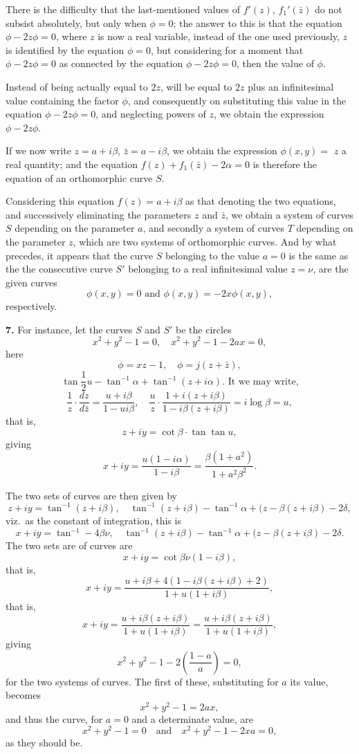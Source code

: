 \documentclass[11pt,a4paper]{book}
\begin{document}
There is the difficulty that the last-mentioned values of $f'(z)$, $f_1'(\bar{z})$ do not subsist absolutely, but only when $\phi = 0$; the answer to this is that the equation $\phi - 2 z \phi = 0$, where $z$ is now a real variable, instead of the one used previously, $z$ is identified by the equation $\phi = 0$, but considering for a moment that $\phi - 2 z \phi = 0$ as connected by the equation $\phi - 2 z \phi = 0$, then the value of $\phi$.

Instead of being actually equal to $2z$, will be equal to $2z$ plus an infinitesimal value containing the factor $\phi$, and consequently on substituting this value in the equation $\phi - 2 z \phi = 0$, and neglecting powers of $z$, we obtain the expression $\phi - 2 z \phi$.

If we now write $z = a + i \beta$, $\bar{z} = a - i \beta$, we obtain the expression $\phi(x, y) = $ $z$ a real quantity; and the equation $f(z) + f_1(\bar{z}) - 2 \alpha = 0$ is therefore the equation of an orthomorphic curve $S$.

Considering this equation $f(z) = a + i \beta$ as that denoting the two equations, and successively eliminating the parameters $z$ and $\bar{z}$, we obtain a system of curves $S$ depending on the parameter $a$, and secondly a system of curves $T$ depending on the parameter $z$, which are two systems of orthomorphic curves. And by what precedes, it appears that the curve $S$ belonging to the value $a = 0$ is the same as the
the consecutive curve $S'$ belonging to a real infinitesimal value $z = \nu$, are the given curves
\[
\phi(x, y) = 0 \text{ and } \phi(x, y) = - 2x\phi(x, y),
\]
respectively.

\textbf{7.} For instance, let the curves $S$ and $S'$ be the circles
\[
x^2 + y^2 - 1 = 0, \quad x^2 + y^2 - 1 - 2a x = 0,
\]
here
\[
\phi = x z - 1, \quad \phi = j (z + \bar{z}),
\]
\[
\tan \frac{1}{2}u - \tan^{-1} \alpha + \tan^{-1}(z + i \alpha). \text{ It we may write,}
\]
\[
\frac{1}{z} \cdot \frac{dz}{d\bar{z}} = \frac{u + i \beta}{1 - u i \beta}, \quad \frac{u}{z} \cdot \frac{1 + i (z + i \beta)}{1 - i \beta(z + i \beta)} = i \log \beta = u,
\]
that is,
\[
z + iy = \cot \beta \cdot \tan \tan u,
\]
giving
\[
x + iy = \frac{u(1 - i \alpha)}{1 - i \beta} = \frac{\beta(1 + a^2)}{1 + a^2 \beta^2}.
\]

The two sets of curves are then given by
\[
z + iy = \tan^{-1}(z + i \beta), \quad \tan^{-1}(z + i \beta) - \tan^{-1} \alpha + (z - \beta(z + i \beta) - 2\delta,
\]
viz.\ as the constant of integration, this is
\[
x + iy = \tan^{-1} - 4\beta\nu, \quad \tan^{-1}(z + i \beta) - \tan^{-1} \alpha + (z - \beta(z + i \beta) - 2\delta.
\]
The two sets are of curves are
\[
x + iy = \cot \beta\nu(1 - i\beta),
\]
that is,
\[
x + iy = \frac{u + i\beta + 4(1 - i\beta(z + i\beta) + 2)}{1 + u (1 + i\beta)},
\]
that is,
\[
x + iy = \frac{u + i\beta(z + i\beta)}{1 + u(1 + i\beta)} = \frac{u + i\beta(z + i\beta)}{1 + u(1 + i\beta)},
\]
giving
\[
x^2 + y^2 - 1 - 2 \left(\frac{1 - a}{a}\right) = 0,
\]
for the two systems of curves. The first of these, substituting for $a$ its value, becomes
\[
x^2 + y^2 - 1 = 2 a x,
\]
and thus the curve, for $a = 0$ and a determinate value, are
\[
x^2 + y^2 - 1 = 0 \quad \text{and} \quad x^2 + y^2 - 1 - 2x a = 0,
\]
as they should be.
\end{document}

